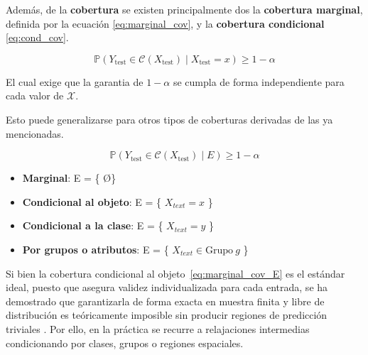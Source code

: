 Además, de la \textbf{cobertura} se existen principalmente dos la \textbf{cobertura marginal}, definida por la ecuación \ref{eq:marginal_cov}, y la \textbf{cobertura condicional} \ref{eq:cond_cov}.

\begin{equation}
    \mathbb{P}\left( Y_{\text{test}} \in \mathcal{C}(X_{\text{test}}) \mid  X_{\text{test}}=x \right) \ge 1 - \alpha
    \label{eq:cond_cov}
\end{equation}

El cual exige que la garantia de $1 - \alpha$ se cumpla de forma independiente para cada valor de $\mathcal{X}$.

Esto puede generalizarse para otros tipos de coberturas derivadas de las ya mencionadas.

\begin{equation}
    \mathbb{P}\left( Y_{\text{test}} \in \mathcal{C}(X_{\text{test}}) \mid  E \right) \ge 1 - \alpha
    \label{eq:marginal_cov_E}
\end{equation}

\begin{itemize}
    \item \textbf{Marginal}: E = \{ \O \}   

    \item \textbf{Condicional al objeto}: E = \{ $X_{text} = x$ \}   

    \item \textbf{Condicional a la clase}: E = \{ $X_{text} = y$ \}  

    \item \textbf{Por grupos o atributos}: E = \{ $X_{text} \in \text{Grupo} \  g$ \}      
    
\end{itemize}


Si bien la cobertura condicional al objeto~\eqref{eq:marginal_cov_E} es el estándar ideal, puesto que asegura validez individualizada para cada entrada, se ha demostrado que garantizarla de forma exacta en muestra finita y libre de distribución es teóricamente imposible sin producir regiones de predicción triviales \cite{vock2012}. Por ello, en la práctica se recurre a relajaciones intermedias condicionando por clases, grupos o regiones espaciales.

